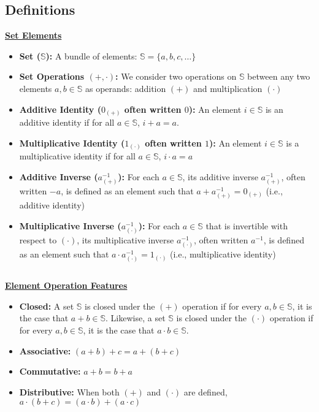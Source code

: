 
\subsection{Definitions}
\label{subsec:group-def}


\begin{tcolorbox}[title={\textbf{\tboxdef{\ref*{subsec:group-def}} Group}}]
\noindent \textbf{\underline{Set Elements}}
\begin{itemize}
\item \textbf{Set ($\mathbb{S}$):} A bundle of elements: $\mathbb{S} = \{a, b, c, \ldots\}$
\item \textbf{Set Operations $\bm{(+, \cdot)}$:} We consider two operations on $\mathbb{S}$ between any two elements $a, b \in \mathbb{S}$ as operands: addition $(+)$ and multiplication $(\cdot)$
\item \textbf{Additive Identity ($0_{(+)}$ often written $0$):} An element $i \in \mathbb{S}$ is an additive identity if for all $a \in \mathbb{S}$, $i + a = a$.
\item \textbf{Multiplicative Identity ($1_{(\cdot)}$ often written $1$):} An element $i \in \mathbb{S}$ is a multiplicative identity if for all $a \in \mathbb{S}$, $i \cdot a = a$
\item \textbf{Additive Inverse ($a^{-1}_{(+)}$):} For each $a \in \mathbb{S}$, its additive inverse $a^{-1}_{(+)}$, often written $-a$, is defined as an element such that $a + a^{-1}_{(+)} = 0_{(+)}$ (i.e., additive identity)
\item \textbf{Multiplicative Inverse ($a^{-1}_{(\cdot)}$):} For each $a \in \mathbb{S}$ that is invertible with respect to $(\cdot)$, its multiplicative inverse $a^{-1}_{(\cdot)}$, often written $a^{-1}$, is defined as an element such that $a \cdot a^{-1}_{(\cdot)} = 1_{(\cdot)}$ (i.e., multiplicative identity)
\end{itemize}

$ $

\noindent \textbf{\underline{Element Operation Features}}
\begin{itemize}
\item \textbf{Closed:} A set $\mathbb{S}$ is closed under the $(+)$ operation if for every $a, b \in \mathbb{S}$, it is the case that $a + b \in \mathbb{S}$. Likewise, a set $\mathbb{S}$ is closed under the $(\cdot)$ operation if for every $a, b \in \mathbb{S}$, it is the case that $a \cdot b \in \mathbb{S}$. 
\item \textbf{Associative:} $(a + b) + c = a + (b + c)$
\item \textbf{Commutative:} $a + b = b + a$
\item \textbf{Distributive:} When both $(+)$ and $(\cdot)$ are defined, $a \cdot (b + c) = (a \cdot b) + (a \cdot c)$
\end{itemize}



\end{tcolorbox}
